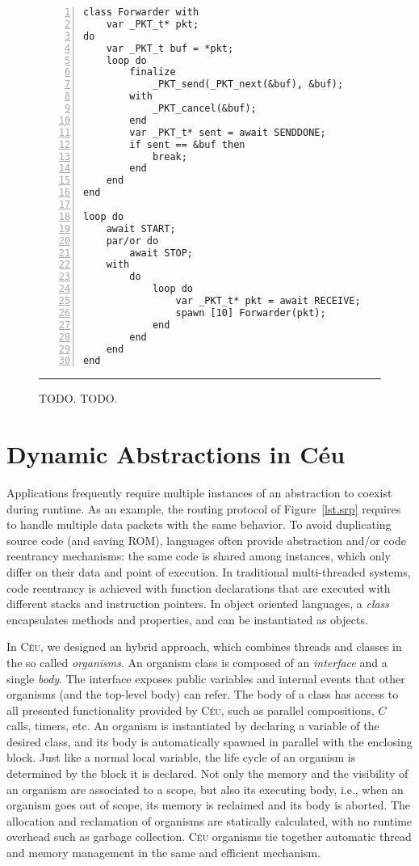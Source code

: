 \documentclass{sig-alternate-ipsn13}
\newcommand{\CEU}{\textsc{C\'{e}u}\xspace}
\begin{document}
\begin{figure}[h]
\begin{lstlisting}[numbers=left,xleftmargin=3em]
class Forwarder with
    var _PKT_t* pkt;
do
    var _PKT_t buf = *pkt;
    loop do
        finalize
            _PKT_send(_PKT_next(&buf), &buf);
        with
            _PKT_cancel(&buf);
        end
        var _PKT_t* sent = await SENDDONE;
        if sent == &buf then
            break;
        end
    end
end

loop do
    await START;
    par/or do
        await STOP;
    with
        do
            loop do
                var _PKT_t* pkt = await RECEIVE;
                spawn [10] Forwarder(pkt);
            end
        end
    end
end
\end{lstlisting}
\rule{8.6cm}{0.37pt}
\caption{ TODO.\newline
{\small %
TODO.
}%
\label{lst.TODO}
}
\end{figure}

\section{Dynamic Abstractions in C\'eu}

Applications frequently require multiple instances of an abstraction to coexist 
during runtime.
As an example, the routing protocol of Figure~\ref{lst.srp} requires to handle 
multiple data packets with the same behavior.
%
To avoid duplicating source code (and saving ROM), languages often provide 
abstraction and/or code reentrancy mechanisms: the same code is shared among 
instances, which only differ on their data and point of execution.
%
In traditional multi-threaded systems, code reentrancy is achieved with 
function declarations that are executed with different stacks and instruction 
pointers.
In object oriented languages, a \emph{class} encapsulates methods and 
properties, and can be instantiated as objects.

In \CEU, we designed an hybrid approach, which combines threads and classes in 
the so called \emph{organisms}.
An organism class is composed of an \emph{interface} and a single \emph{body}.
The interface exposes public variables and internal events that other organisms 
(and the top-level body) can refer.
The body of a class has access to all presented functionality provided by \CEU, 
such as parallel compositions, $C$ calls, timers, etc.
An organism is instantiated by declaring a variable of the desired class, and 
its body is automatically spawned in parallel with the enclosing block.
%
Just like a normal local variable, the life cycle of an organism is determined 
by the block it is declared.
Not only the memory and the visibility of an organism are associated to a 
scope, but also its executing body, i.e., when an organism goes out of scope, 
its memory is reclaimed and its body is aborted.
%
The allocation and reclamation of organisms are statically calculated, with no 
runtime overhead such as garbage collection.
\CEU organisms tie together automatic thread and memory management in the same 
and efficient mechanism.
\end{document}
